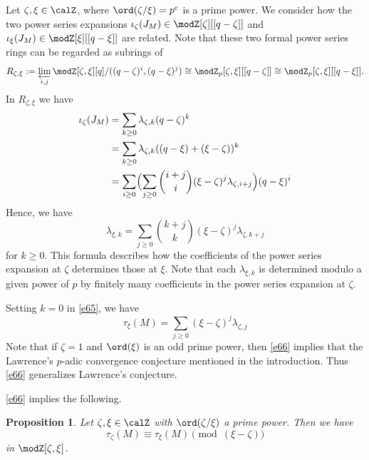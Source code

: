 \documentclass{amsart}
\numberwithin{equation}{section}
\numberwithin{figure}{section}
\theoremstyle{plain}
\newtheorem{proposition}[theorem]{Proposition}
\theoremstyle{definition}
\theoremstyle{remark}
\begin{document}
Let $\zeta ,\xi \in \calZ$, where $\ord(\zeta /\xi )=p^e$ is a prime power.  We
consider how the two power series expansions
$\iota _\zeta (J_M)\in \modZ [\zeta ][[q-\zeta ]]$ and $\iota _\xi (J_M)\in \modZ [\xi ][[q-\xi ]]$ are
related.  Note that these two formal power series rings can be
regarded as subrings of
\begin{equation*}
  R_{\zeta ,\xi }:=\varprojlim_{i,j}\modZ [\zeta ,\xi ][q]/((q-\zeta )^i,(q-\xi )^j)\cong
  \modZ _p[\zeta ,\xi ][[q-\zeta ]]\cong\modZ _p[\zeta ,\xi ][[q-\xi ]].
\end{equation*}
In $R_{\zeta ,\xi }$ we have
\begin{equation*}
  \begin{split}
    \iota _\zeta (J_M)
    &=\sum_{k\ge 0}\lambda _{\zeta ,k}(q-\zeta )^k\\
    &=\sum_{k\ge 0}\lambda _{\zeta ,k}((q-\xi )+(\xi -\zeta ))^k\\
    &=\sum_{i\ge 0}\Bigl(\sum_{j\ge 0}\binom{i+j}{i}(\xi -\zeta )^j\lambda _{\zeta ,i+j}\Bigr)(q-\xi )^i\\
  \end{split}
\end{equation*}
Hence, we have
\begin{equation}
  \label{e65}
  \lambda _{\xi ,k}=\sum_{j\ge 0}\binom{k+j}{k}(\xi -\zeta )^j\lambda _{\zeta ,k+j}
\end{equation}
for $k\ge 0$.  This formula describes how the coefficients of the power
series expansion at $\zeta $ determines those at $\xi $.  Note that each
$\lambda _{\xi ,k}$ is determined modulo a given power of $p$ by finitely many
coefficients in the power series expansion at $\zeta $.

Setting $k=0$ in \eqref{e65}, we have
\begin{equation}
  \label{e66}
  \tau _\xi (M)=\sum_{j\ge 0}(\xi -\zeta )^j\lambda _{\zeta ,j}
\end{equation}
Note that if $\zeta =1$ and $\ord(\xi )$ is an odd prime power, then
\eqref{e66} implies that the Lawrence's $p$-adic convergence
conjecture mentioned in the introduction.  Thus \eqref{e66}
generalizes Lawrence's conjecture.

\eqref{e66} implies the following.

\begin{proposition}
  \label{r67}
  Let $\zeta ,\xi \in \calZ$ with $\ord(\zeta /\xi )$ a prime power.  Then we have
  \begin{equation*}
    \tau _\zeta (M)\equiv \tau _\xi (M)\pmod{(\xi -\zeta )}
  \end{equation*}
  in $\modZ [\zeta ,\xi ]$.
\end{proposition}
\end{document}
